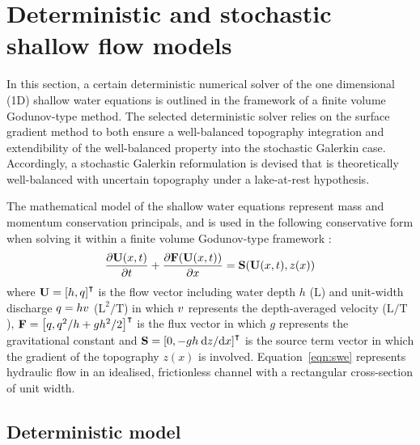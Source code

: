 \section{Deterministic and stochastic shallow flow models}

In this section, a certain deterministic numerical solver of the one dimensional (1D) shallow water equations is outlined in the framework of a finite volume Godunov-type method.
The selected deterministic solver relies on the surface gradient method \citep{zhou2001} to both ensure a well-balanced topography integration and extendibility of the well-balanced property into the stochastic Galerkin case. 
Accordingly, a stochastic Galerkin reformulation is devised that is theoretically well-balanced with uncertain topography under a lake-at-rest hypothesis.

The mathematical model of the shallow water equations represent mass and momentum
conservation principals, and is used in the following conservative form when solving it within a finite volume Godunov-type framework \citep{toro-garcianavarro2007}:
\begin{align}
\frac{\partial \mathbf{U}(x, t)}{\partial t} + \frac{\partial \mathbf{F}(\mathbf{U}(x, t))}{\partial x} = \mathbf{S}(\mathbf{U}(x, t), z(x)) \label{eqn:swe}
\end{align}
where $\mathbf{U} = \left[ h, q \right]^\intercal$ is the flow vector including water depth $h$ ($\mathrm{L}$) and unit-width discharge $q = hv$ ($\mathrm{L}^2/\mathrm{T}$) in which $v$ represents the depth-averaged velocity ($\mathrm{L}/\mathrm{T}$), $\mathbf{F} = \left[ q,  q^2/h + gh^2/2 \right]^\intercal$ is the flux vector in which $g$ represents the gravitational constant and $\mathbf{S} = \left[ 0, -gh \: \mathrm{d} z / \mathrm{d} x \right]^\intercal$ is the source term vector in which the gradient of the topography $z(x)$ is involved.
Equation~\eqref{eqn:swe} represents hydraulic flow in an idealised, frictionless channel with a rectangular cross-section of unit width.

\subsection{Deterministic model}

